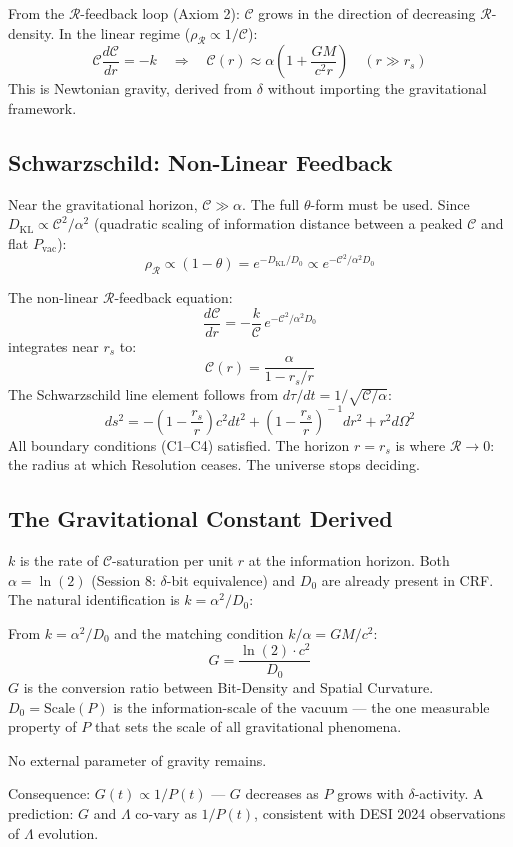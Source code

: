 \documentclass[12pt]{article}
\begin{document}
From the $\mathcal{R}$-feedback loop (Axiom 2): $\mathcal{C}$ grows
in the direction of decreasing $\mathcal{R}$-density. In the linear
regime ($\rho_\mathcal{R} \propto 1/\mathcal{C}$):
\[
  \mathcal{C}\frac{d\mathcal{C}}{dr} = -k
  \quad\Rightarrow\quad
  \mathcal{C}(r) \approx \alpha\!\left(1 + \frac{GM}{c^2 r}\right)
  \quad (r \gg r_s)
\]
This is Newtonian gravity, derived from $\delta$ without importing
the gravitational framework.

\subsection{Schwarzschild: Non-Linear Feedback}

Near the gravitational horizon, $\mathcal{C} \gg \alpha$. The full
$\theta$-form must be used. Since $D_{\mathrm{KL}} \propto
\mathcal{C}^2/\alpha^2$ (quadratic scaling of information distance
between a peaked $\mathcal{C}$ and flat $P_{\mathrm{vac}}$):
\[
  \rho_\mathcal{R} \propto (1-\theta) = e^{-D_{\mathrm{KL}}/D_0}
  \propto e^{-\mathcal{C}^2/\alpha^2 D_0}
\]

\begin{derivedbox}
The non-linear $\mathcal{R}$-feedback equation:
\[
  \frac{d\mathcal{C}}{dr} = -\frac{k}{\mathcal{C}}\,
  e^{-\mathcal{C}^2/\alpha^2 D_0}
\]
integrates near $r_s$ to:
\[
  \mathcal{C}(r) = \frac{\alpha}{1 - r_s/r}
\]
The Schwarzschild line element follows from
$d\tau/dt = 1/\sqrt{\mathcal{C}/\alpha}$:
\[
  ds^2 = -\!\left(1-\frac{r_s}{r}\right)c^2 dt^2
  + \left(1-\frac{r_s}{r}\right)^{\!-1}dr^2
  + r^2 d\Omega^2
\]
All boundary conditions (C1--C4) satisfied. The horizon
$r = r_s$ is where $\mathcal{R} \to 0$: the radius at which
Resolution ceases. The universe stops deciding.
\end{derivedbox}

\subsection{The Gravitational Constant Derived}

$k$ is the rate of $\mathcal{C}$-saturation per unit $r$ at the
information horizon. Both $\alpha = \ln(2)$ (Session 8:
$\delta$-bit equivalence) and $D_0$ are already present in CRF.
The natural identification is $k = \alpha^2/D_0$:

\begin{derivedbox}
From $k = \alpha^2/D_0$ and the matching condition
$k/\alpha = GM/c^2$:
\[
  \boxed{G = \frac{\ln(2) \cdot c^2}{D_0}}
\]
$G$ is the conversion ratio between Bit-Density and Spatial
Curvature. $D_0 = \mathrm{Scale}(P)$ is the
information-scale of the vacuum --- the one measurable property
of $P$ that sets the scale of all gravitational phenomena.

No external parameter of gravity remains.

Consequence: $G(t) \propto 1/P(t)$ --- $G$ decreases as $P$
grows with $\delta$-activity. A prediction: $G$ and $\Lambda$
co-vary as $1/P(t)$, consistent with DESI 2024 observations of
$\Lambda$ evolution.
\end{derivedbox}
\end{document}
